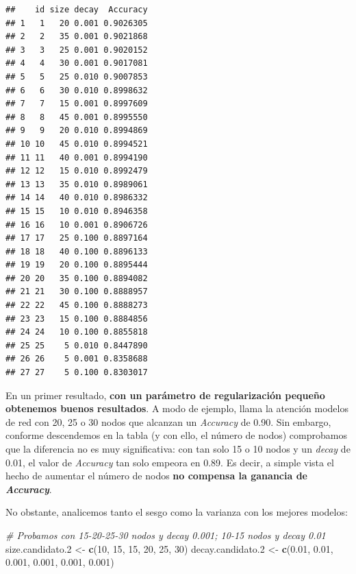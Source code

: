 \documentclass[
]{article}
\newenvironment{Shaded}{\begin{snugshade}}{\end{snugshade}}
\newcommand{\CommentTok}[1]{\textcolor[rgb]{0.56,0.35,0.01}{\textit{#1}}}
\newcommand{\DecValTok}[1]{\textcolor[rgb]{0.00,0.00,0.81}{#1}}
\newcommand{\FloatTok}[1]{\textcolor[rgb]{0.00,0.00,0.81}{#1}}
\newcommand{\KeywordTok}[1]{\textcolor[rgb]{0.13,0.29,0.53}{\textbf{#1}}}
\newcommand{\NormalTok}[1]{#1}
\newcommand{\StringTok}[1]{\textcolor[rgb]{0.31,0.60,0.02}{#1}}
\begin{document}
\begin{verbatim}
##    id size decay  Accuracy
## 1   1   20 0.001 0.9026305
## 2   2   35 0.001 0.9021868
## 3   3   25 0.001 0.9020152
## 4   4   30 0.001 0.9017081
## 5   5   25 0.010 0.9007853
## 6   6   30 0.010 0.8998632
## 7   7   15 0.001 0.8997609
## 8   8   45 0.001 0.8995550
## 9   9   20 0.010 0.8994869
## 10 10   45 0.010 0.8994521
## 11 11   40 0.001 0.8994190
## 12 12   15 0.010 0.8992479
## 13 13   35 0.010 0.8989061
## 14 14   40 0.010 0.8986332
## 15 15   10 0.010 0.8946358
## 16 16   10 0.001 0.8906726
## 17 17   25 0.100 0.8897164
## 18 18   40 0.100 0.8896133
## 19 19   20 0.100 0.8895444
## 20 20   35 0.100 0.8894082
## 21 21   30 0.100 0.8888957
## 22 22   45 0.100 0.8888273
## 23 23   15 0.100 0.8884856
## 24 24   10 0.100 0.8855818
## 25 25    5 0.010 0.8447890
## 26 26    5 0.001 0.8358688
## 27 27    5 0.100 0.8303017
\end{verbatim}

En un primer resultado, \textbf{con un parámetro de regularización
pequeño obtenemos buenos resultados}. A modo de ejemplo, llama la
atención modelos de red con 20, 25 o 30 nodos que alcanzan un
\emph{Accuracy} de 0.90. Sin embargo, conforme descendemos en la tabla
(y con ello, el número de nodos) comprobamos que la diferencia no es muy
significativa: con tan solo 15 o 10 nodos y un \emph{decay} de 0.01, el
valor de \emph{Accuracy} tan solo empeora en 0.89. Es decir, a simple
vista el hecho de aumentar el número de nodos \textbf{no compensa la
ganancia de \emph{Accuracy}}.

No obstante, analicemos tanto el sesgo como la varianza con los mejores
modelos:

\begin{Shaded}
\begin{Highlighting}[]
\CommentTok{\# Probamos con 15{-}20{-}25{-}30 nodos y decay 0.001; 10{-}15 nodos y decay 0.01}
\NormalTok{size.candidato}\FloatTok{.2}\NormalTok{  <{-}}\StringTok{ }\KeywordTok{c}\NormalTok{(}\DecValTok{10}\NormalTok{, }\DecValTok{15}\NormalTok{, }\DecValTok{15}\NormalTok{, }\DecValTok{20}\NormalTok{, }\DecValTok{25}\NormalTok{, }\DecValTok{30}\NormalTok{)}
\NormalTok{decay.candidato}\FloatTok{.2}\NormalTok{ <{-}}\StringTok{ }\KeywordTok{c}\NormalTok{(}\FloatTok{0.01}\NormalTok{, }\FloatTok{0.01}\NormalTok{, }\FloatTok{0.001}\NormalTok{, }\FloatTok{0.001}\NormalTok{, }\FloatTok{0.001}\NormalTok{, }\FloatTok{0.001}\NormalTok{)}
\end{Highlighting}
\end{Shaded}
\end{document}
